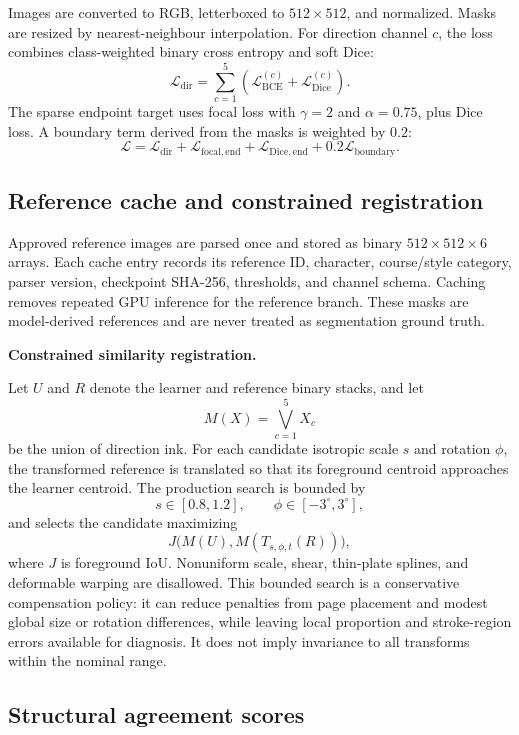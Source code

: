 Images are converted to RGB, letterboxed to \(512\times512\), and normalized.
Masks are resized by nearest-neighbour interpolation. For direction channel
\(c\), the loss combines class-weighted binary cross entropy and soft Dice:
\[
\mathcal{L}_{\mathrm{dir}}
=\sum_{c=1}^{5}
\left(
\mathcal{L}_{\mathrm{BCE}}^{(c)}
+\mathcal{L}_{\mathrm{Dice}}^{(c)}
\right).
\]
The sparse endpoint target uses focal loss with \(\gamma=2\) and
\(\alpha=0.75\), plus Dice loss. A boundary term derived from the masks is
weighted by \(0.2\):
\[
\mathcal{L}
=\mathcal{L}_{\mathrm{dir}}
+\mathcal{L}_{\mathrm{focal,end}}
+\mathcal{L}_{\mathrm{Dice,end}}
+0.2\mathcal{L}_{\mathrm{boundary}}.
\]

\subsection{Reference cache and constrained registration}

Approved reference images are parsed once and stored as binary
\(512\times512\times6\) arrays. Each cache entry records its reference ID,
character, course/style category, parser version, checkpoint SHA-256,
thresholds, and channel schema. Caching removes repeated GPU inference for the
reference branch. These masks are model-derived references and are never
treated as segmentation ground truth.

\medskip
\noindent\textbf{Constrained similarity registration.}
\label{sec:alignment-method}

Let \(U\) and \(R\) denote the learner and reference binary stacks, and let
\[
M(X)=\bigvee_{c=1}^{5}X_c
\]
be the union of direction ink. For each candidate isotropic scale \(s\) and
rotation \(\phi\), the transformed reference is translated so that its
foreground centroid approaches the learner centroid. The production search is
bounded by
\[
s\in[0.8,1.2],\qquad \phi\in[-3^\circ,3^\circ],
\]
and selects the candidate maximizing
\[
J\bigl(M(U),M(T_{s,\phi,t}(R))\bigr),
\]
where \(J\) is foreground IoU. Nonuniform scale, shear, thin-plate splines, and
deformable warping are disallowed. This bounded search is a conservative
compensation policy: it can reduce penalties from page placement and modest
global size or rotation differences, while leaving local proportion and
stroke-region errors available for diagnosis. It does not imply invariance to
all transforms within the nominal range.

\subsection{Structural agreement scores}

